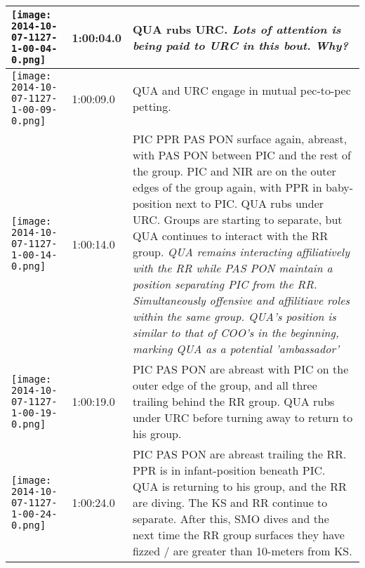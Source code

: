 \documentclass[11pt]{amsart}
\begin{document}
\begin{longtable}{| m{} | m{} | m{} |}
\texttt{[image: 2014-10-07-1127-1-00-04-0.png]} & 1:00:04.0 & QUA rubs URC. \textit{Lots of attention is being paid to URC in this bout. Why?} \\ \hline
\texttt{[image: 2014-10-07-1127-1-00-09-0.png]} & 1:00:09.0 &  QUA and URC engage in mutual pec-to-pec petting. \\ \hline
\texttt{[image: 2014-10-07-1127-1-00-14-0.png]} & 1:00:14.0 &  PIC PPR PAS PON surface again, abreast, with PAS PON between PIC and the rest of the group. PIC and NIR are on the outer edges of the group again, with PPR in baby-position next to PIC. QUA rubs under URC. Groups are starting to separate, but QUA continues to interact with the RR group. \textit{QUA remains interacting affiliatively with the RR while PAS PON maintain a position separating PIC from the RR. Simultaneously offensive and affilitiave roles within the same group. QUA's position is similar to that of COO's in the beginning, marking QUA as a potential 'ambassador'} \\ \hline
\texttt{[image: 2014-10-07-1127-1-00-19-0.png]} & 1:00:19.0 & PIC PAS PON are abreast with PIC on the outer edge of the group, and all three trailing behind the RR group. QUA rubs under URC before turning away to return to his group. \\ \hline
\texttt{[image: 2014-10-07-1127-1-00-24-0.png]} & 1:00:24.0 &  PIC PAS PON are abreast trailing the RR. PPR is in infant-position beneath PIC. QUA is returning to his group, and the RR are diving. The KS and RR continue to separate. After this, SMO dives and the next time the RR group surfaces they have fizzed / are greater than 10-meters from KS. \\ \hline

\end{longtable}
\end{document}
